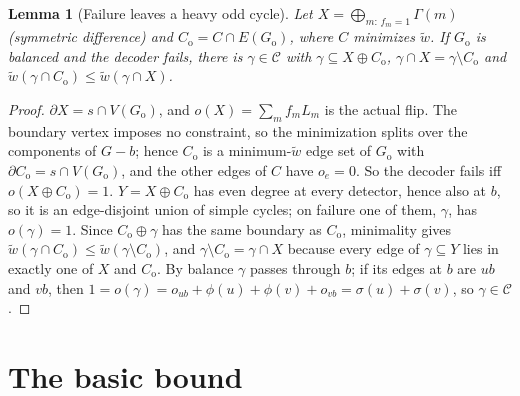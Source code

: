 \documentclass[11pt]{article}
\theoremstyle{plain}
\newtheorem{lemma}{Lemma}
\theoremstyle{definition}
\theoremstyle{remark}
\newcommand{\Go}{G_{\mathrm{o}}}
\newcommand{\Co}{C_{\mathrm{o}}}
\newcommand{\cC}{\mathcal{C}}
\newcommand{\tw}{\tilde w}
\renewcommand{\_}{\oldunderscore\allowbreak}
\begin{document}
\begin{lemma}[Failure leaves a heavy odd cycle]\label{lem:cycle}
Let $X=\bigoplus_{m:\,f_m=1}\Gamma(m)$ (symmetric difference) and $\Co=C\cap E(\Go)$, where $C$ minimizes $\tw$. If $\Go$ is balanced and the decoder fails, there is $\gamma\in\cC$ with $\gamma\subseteq X\oplus\Co$, $\gamma\cap X=\gamma\setminus\Co$ and $\tw(\gamma\cap\Co)\le\tw(\gamma\cap X)$.
\end{lemma}
\begin{proof}
$\partial X=s\cap V(\Go)$, and $o(X)=\sum_mf_mL_m$ is the actual flip. The boundary vertex imposes no constraint, so the minimization splits over the components of $G-b$; hence $\Co$ is a minimum-$\tw$ edge set of $\Go$ with $\partial\Co=s\cap V(\Go)$, and the other edges of $C$ have $o_e=0$. So the decoder fails iff $o(X\oplus\Co)=1$. $Y=X\oplus\Co$ has even degree at every detector, hence also at $b$, so it is an edge-disjoint union of simple cycles; on failure one of them, $\gamma$, has $o(\gamma)=1$. Since $\Co\oplus\gamma$ has the same boundary as $\Co$, minimality gives $\tw(\gamma\cap\Co)\le\tw(\gamma\setminus\Co)$, and $\gamma\setminus\Co=\gamma\cap X$ because every edge of $\gamma\subseteq Y$ lies in exactly one of $X$ and $\Co$. By balance $\gamma$ passes through $b$; if its edges at $b$ are $ub$ and $vb$, then $1=o(\gamma)=o_{ub}+\phi(u)+\phi(v)+o_{vb}=\sigma(u)+\sigma(v)$, so $\gamma\in\cC$.
\end{proof}

\section{The basic bound}\label{sec:basic}
\end{document}
